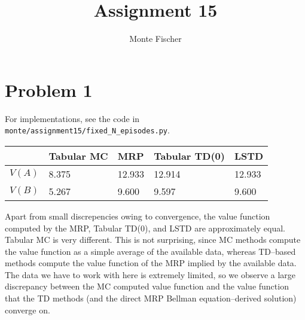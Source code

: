 \documentclass{article}
\title{Assignment 15}
\author{Monte Fischer}
\begin{document}
\maketitle

\section*{Problem 1}
For implementations, see the code in \texttt{monte/assignment15/fixed\_N\_episodes.py}.

\begin{table}[h]
\begin{tabular}{lllll}
       & \textbf{Tabular MC} & \textbf{MRP} & \textbf{Tabular TD(0)} & \textbf{LSTD} \\ \hline
$V(A)$ & 8.375               & 12.933       & 12.914                 & 12.933        \\
$V(B)$ & 5.267               & 9.600        & 9.597                  & 9.600        
\end{tabular}
\end{table}

Apart from small discrepencies owing to convergence, the value function computed by the MRP, Tabular TD(0), and LSTD are approximately equal. Tabular MC is very different. This is not surprising, since MC methods compute the value function as a simple average of the available data, whereas TD--based methods compute the value function of the MRP implied by the available data. The data we have to work with here is extremely limited, so we observe a large discrepancy between the MC computed value function and the value function that the TD methods (and the direct MRP Bellman equation--derived solution) converge on.
\end{document}
